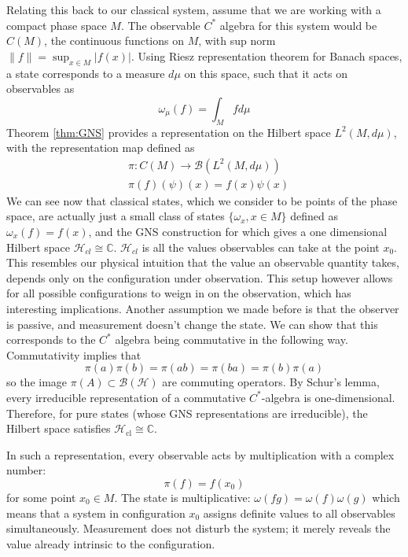 \documentclass[
  12pt,
  a4paper, oneside
]{report}
\theoremstyle{bolddef}
\theoremstyle{remark}
\numberwithin{equation}{chapter}
\begin{document}
\bigskip 

Relating this back to our classical system, assume that we are working with a compact phase space $M$. The observable $C^{*}$ algebra for this system would be $C(M)$, the continuous functions on $M$, with sup norm $\|f\| = \sup_{x \in M}|f(x)|$. Using Riesz representation theorem for Banach spaces, a state corresponds to a measure $d\mu$ on this space, such that it acts on observables as 
\begin{equation}
    \omega_{\mu}(f) = \int_{M}  f d \mu
\end{equation}
 Theorem \ref{thm:GNS} provides a representation on the Hilbert space $L^{2}(M,d\mu)$, with the representation map defined as 
\begin{equation}
    \begin{split}
       & \pi : C(M) \longrightarrow \mathcal{B}(L^{2}(M,d\mu)) \\
       & \pi(f)(\psi)(x) = f(x)\psi(x)
    \end{split}
\end{equation}
We can see now that classical states, which we consider to be points of the phase space, are actually just a small class of states $\{\omega_{x}, x \in M\}$ defined as $\omega_{x}(f) = f(x)$, and the GNS construction for which gives a one dimensional Hilbert space $\mathcal{H}_{cl} \cong \mathbb{C}$. $\mathcal{H}_{cl}$ is all the values observables can take at the point $x_{0}$.\\
This resembles our physical intuition that the value an observable quantity takes, depends only on the configuration under observation. This setup however allows for all possible configurations to weign in on the observation, which has interesting implications. Another assumption we made before is that the observer is passive, and measurement doesn't change the state. We can show that this corresponds to the $C^{*}$ algebra being commutative in the following way. \\
Commutativity implies that 
$$ 
\pi(a)\pi(b)=\pi(ab)=\pi(ba)=\pi(b)\pi(a)
$$ 
so the image $\pi(A) \subset \mathcal{B}(\mathcal{H})$ are commuting operators. By Schur’s lemma, every irreducible representation of a commutative $C^*$-algebra is one-dimensional.
Therefore, for pure states (whose GNS representations are irreducible), the Hilbert space satisfies
$\mathcal{H}_{\text{cl}} \cong \mathbb{C}.$

In such a representation, every observable acts by multiplication with a complex number:
$$\pi(f) = f(x_0)$$
for some point $x_0 \in M$. The state is multiplicative:
$\omega(fg) = \omega(f)\omega(g)$
which means that a system in configuration $x_0$ assigns definite values to all observables simultaneously. Measurement does not disturb the system; it merely reveals the value already intrinsic to the configuration. 
\bigskip
\end{document}
